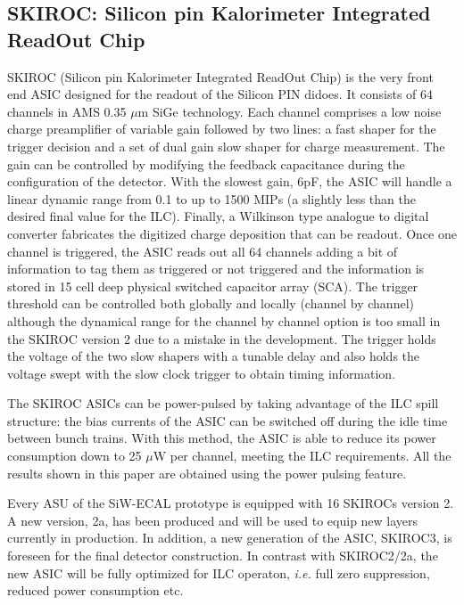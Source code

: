 \documentclass[a4paper,11pt]{article}
\begin{document}
\subsection{SKIROC: Silicon pin Kalorimeter Integrated ReadOut Chip}
\label{sec:skiroc}

SKIROC\cite{Callier:2011zz} (Silicon pin Kalorimeter Integrated ReadOut Chip) is the very front end ASIC designed for the readout of the Silicon PIN didoes.
It consists of 64 channels in AMS 0.35 $\mu$m SiGe technology. Each channel comprises a low noise charge preamplifier of variable gain followed by two lines:
a fast shaper for the trigger decision and a set of dual gain slow shaper for charge measurement. 
The gain can be controlled by modifying the feedback capacitance during the configuration of the detector.
With the slowest gain, 6pF, the ASIC will handle a linear dynamic range from 0.1 to up to 1500 MIPs 
(a slightly less than the desired final value for the ILC). 
Finally, a Wilkinson type analogue to digital converter fabricates the digitized charge deposition that can be readout. 
Once one channel is triggered, the ASIC reads out all 64 channels adding a bit of information to tag them as
triggered or not triggered and the information is stored in 15 cell deep physical switched capacitor array (SCA).
The trigger threshold can be controlled both globally and locally (channel by channel) although the
dynamical range for the channel by channel option is too small in the SKIROC version 2 due to a mistake in the development. The trigger holds the voltage of the two slow shapers with a tunable delay and also
holds the voltage swept with the slow clock trigger to obtain timing information. 

The SKIROC ASICs can be power-pulsed by taking advantage of the ILC spill structure: 
the bias currents of the ASIC can be switched off during the idle time between bunch trains.
With this method, the ASIC is able to reduce its power consumption down to 25 $\mu$W per channel,
meeting the ILC requirements. All the results shown in this paper are obtained using the power pulsing feature.

Every ASU of the SiW-ECAL prototype is equipped with 16 SKIROCs version 2. A new version, 2a, has been produced and will be used to equip new layers currently in production.
In addition, a new generation of the ASIC, SKIROC3, is foreseen for the final detector construction.
In contrast with SKIROC2/2a, the new ASIC will be fully optimized for ILC operaton, {\it i.e.} full zero suppression, reduced power consumption etc.
\end{document}
